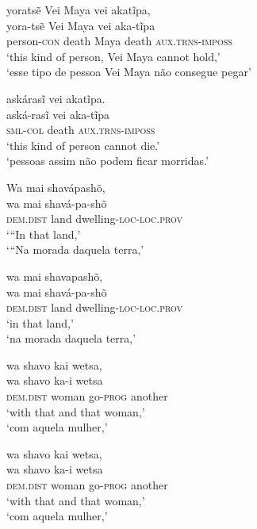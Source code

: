 \documentclass[output=paper,
modfonts,nonflat
]{langsci/langscibook}
\begin{document}
\ea yoratsẽ Vei Maya vei akatĩpa, \\[.3em]
\gll yora-tsẽ            Vei   Maya vei   aka-tĩpa                 \\
     person-\textsc{con} death Maya death \textsc{aux.trns-imposs} \\
\glt `this kind of person, Vei Maya cannot hold,' \\
`esse tipo de pessoa Vei Maya não consegue pegar' \\
\z

\ea askárasĩ vei akatĩpa. \\[.3em]
\gll aská-rasĩ        vei   aka-tĩpa                 \\
     \textsc{sml-col} death \textsc{aux.trns-imposs} \\
\glt `this kind of person cannot die.' \\
`pessoas assim não podem ficar morridas.' \\
\z

\ea Wa mai shavápashõ, \\[.3em]
\gll wa                mai  shavá-pa-shõ                   \\
     \textsc{dem.dist} land dwelling-\textsc{loc-loc.prov} \\
\glt ‘“In that land,' \\
`{}``Na morada daquela terra,' \\
\z

\ea wa mai shavapashõ, \\[.3em]
\gll wa                mai  shavá-pa-shõ                   \\
     \textsc{dem.dist} land dwelling\textsc{-loc-loc.prov} \\
\glt `in that land,' \\
`na morada daquela terra,' 
\z

\largerpage
\ea wa shavo kai wetsa, \\[.3em]
\gll wa                shavo ka-i              wetsa   \\
     \textsc{dem.dist} woman go-\textsc{prog} another \\
\glt `with that and that woman,' \\
`com aquela mulher,' \\
\z

\newpage 
\ea wa shavo kai wetsa, \\[.3em]
\gll wa                shavo ka-i             wetsa   \\
     \textsc{dem.dist} woman go-\textsc{prog} another \\
\glt `with that and that woman,' \\
`com aquela mulher,' \\
\z
\end{document}
